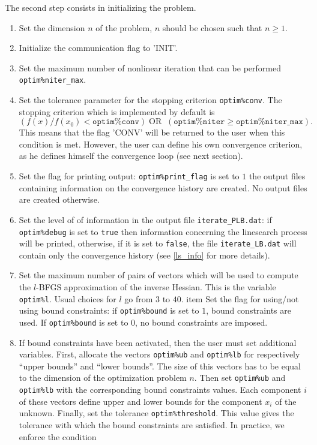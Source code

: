 \documentclass[a4paper,twoside,final,onecolumn,11pt,openright]{article}
\begin{document}
The second step consists in initializing the problem.
\begin{enumerate}
 \item Set the dimension $n$ of the problem, $n$ should be chosen such that $n\geq1$.
 \item Initialize the communication flag to 'INIT'.
 \item Set the maximum number of nonlinear iteration that can be performed \texttt{optim\%niter\_max}.
 \item Set the tolerance parameter for the stopping criterion \texttt{optim\%conv}. The stopping criterion which is implemented by default is 
\begin{equation}
 \left(f(x)/f(x_0)< \texttt{optim\%conv}\right) \; \textrm{OR} \;\;  \left(\texttt{optim\%niter}\geq\texttt{optim\%niter\_max}\right).
\end{equation}
This means that the flag 'CONV' will be returned to the user when this condition is met. However, the user can define his own convergence criterion, as he defines himself the convergence loop (see next section). 
\item  Set the flag for printing output: \texttt{optim\%print\_flag} is set to $1$ the output files containing information on the convergence history are created. No output files are created otherwise.
 \item Set the level of of information in the output file \texttt{iterate\_PLB.dat}: if \texttt{optim\%debug} is set to \texttt{true} then information concerning the linesearch process will be printed, otherwise, if it is set to \texttt{false}, the file \texttt{iterate\_LB.dat} will contain only the convergence history (see \ref{ls_info} for more details).
\item Set the maximum number of pairs of vectors which will be used to compute the $l$-BFGS approximation of the inverse Hessian. This is the variable \texttt{optim\%l}. Usual choices for $l$ go from $3$ to $40$. 
item Set the flag for using/not using bound constraints: if \texttt{optim\%bound} is set to $1$, bound constraints are used. If  \texttt{optim\%bound} is set to $0$, no bound constraints are imposed.
\item If bound constraints have been activated, then the user must set additional variables. First, allocate the vectors \texttt{optim\%ub} and \texttt{optim\%lb} for respectively ``upper bounds'' and ``lower bounds''. The size of this vectors has to be equal to the dimension of the optimization problem $n$. Then set \texttt{optim\%ub} and \texttt{optim\%lb} with the corresponding bound constraints values. Each component $i$ of these vectors define upper and lower bounds for the component $x_i$ of the unknown. Finally, set the tolerance \texttt{optim\%threshold}. This value gives the tolerance with which the bound constraints are satisfied. In practice, we enforce the condition

\end{enumerate}
\end{document}
